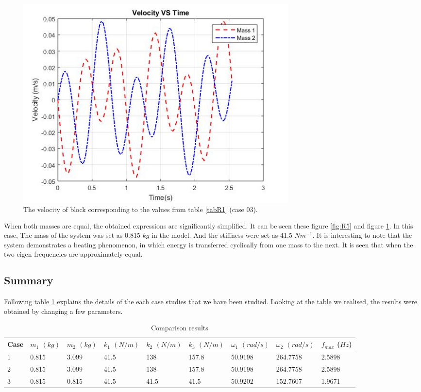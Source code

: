   \newpage
  
  
  \begin{figure}[hbt!]
	\centering
	\begin{framed}
	\includegraphics[width=0.7\textwidth]{Figures/R3V.jpg}
		\end{framed}
	\caption{ The velocity of block corresponding to the values from table \ref{tabR1} (case 03). }
	\label{fig:R6}
\end{figure}

When both masses are equal, the obtained expressions are significantly simplified. It can be seen these figure \ref{fig:R5} and figure \ref{fig:R6}. In this case, The mass of the system was set as 0.815 $kg$ in the model.  And the stiffness were set as 41.5 $Nm^{-1}$.  It is interesting to note that the system demonstrates a beating phenomenon, in which energy is transferred cyclically from one mass to the next. It is seen that when the two eigen frequencies are approximately equal. 

\subsection{Summary}
\paragraph{}

 Following table \ref{tbo} explains the details of the each case studies that we have been studied. Looking at the table we realised, the results were obtained by changing a few parameters. 

\begin{table}[h]
\begin{center}
\begin{tabular}{@{}|l|l|l|l|l|l|l|l|l|@{}}
\toprule
Case & $m_1$ $(kg)$ & $m_2$ $(kg)$ & $k_1$ $(N/m)$ & $k_2$ $(N/m)$ & $k_3$ $(N/m)$& $\omega_1$ $(rad/s)$ & $\omega_2$ $(rad/s)$ & $f_{max}$ ($Hz$) \\
\midrule \hline
 1    & 0.815  & 3.099 & 41.5 & 138 & 157.8 & 50.9198 &  264.7758 & 2.5898  \\ 
\hline
2    & 0.815  & 3.099 \footnotemark[1]  & 41.5 & 138 & 157.8 & 50.9198 & 264.7758 & 2.5898 \\ \hline
3    & 0.815  & 0.815  & 41.5 & 41.5 & 41.5 & 50.9202 & 152.7607& 1.9671  \\
\hline
\end{tabular}
\caption{Comparison results}
\label{tbo}
\end{center}
\end{table}

